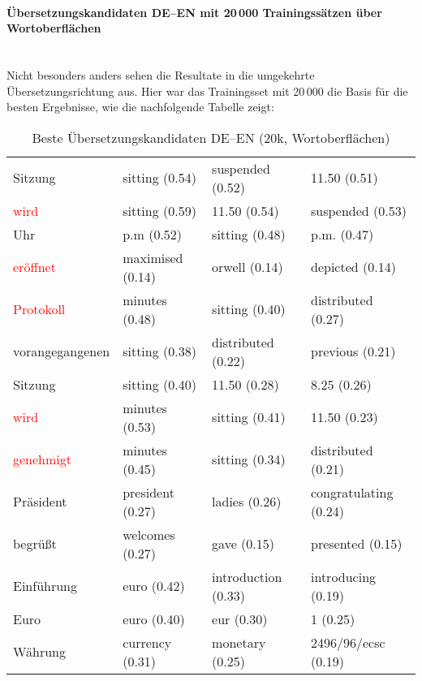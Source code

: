 \documentclass[11pt,twoside,openright]{mpreport}
\begin{document}
\paragraph{Übersetzungskandidaten DE--EN mit 20\,000 Trainingssätzen über Wortoberflächen\\\\}
Nicht besonders anders sehen die Resultate in die umgekehrte Übersetzungsrichtung aus. Hier war das Trainingsset mit 20\,000 die Basis für die besten Ergebnisse, wie die nachfolgende Tabelle zeigt:
\label{sec:evalDeEn10kSurf}
\hspace{-4cm}
\begin{table}[H]
\caption{Beste Übersetzungskandidaten DE--EN (20k, Wortoberflächen)}
\begin{scriptsize}
\begin{tabular}{|llll|}
\hline
Sitzung                 & sitting (0.54) & suspended (0.52) & 11.50 (0.51) \\ %
\textcolor{red}{wird}                    & sitting (0.59) & 11.50 (0.54) & suspended (0.53) \\
Uhr                     & p.m (0.52) & sitting (0.48) & p.m. (0.47) \\ %
\textcolor{red}{eröffnet}               & maximised (0.14) & orwell (0.14) & depicted (0.14) \\
\textcolor{red}{Protokoll}               & minutes (0.48) & sitting (0.40) & distributed (0.27) \\
vorangegangenen         & sitting (0.38) & distributed (0.22) & previous (0.21) \\ %
Sitzung                 & sitting (0.40) & 11.50 (0.28) & 8.25 (0.26) \\ %
\textcolor{red}{wird}                    & minutes (0.53) & sitting (0.41) & 11.50 (0.23) \\
\textcolor{red}{genehmigt}               & minutes (0.45) & sitting (0.34) & distributed (0.21) \\
Präsident              & president (0.27) & ladies (0.26) & congratulating (0.24) \\ %
begrüßt               & welcomes (0.27) & gave (0.15) & presented (0.15) \\ %
Einführung             & euro (0.42) & introduction (0.33) & introducing (0.19) \\ %
Euro                    & euro (0.40) & eur (0.30) & 1 (0.25) \\ %
Währung                & currency (0.31) & monetary (0.25) & 2496/96/ecsc (0.19) \\ %

\end{tabular}
\end{scriptsize}
\end{table}
\end{document}
